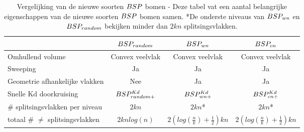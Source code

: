 \begin{table}[tb]
    \centering
    \begin{tabular}{@{}|l|c|c|c|@{}} \toprule      
            & $BSP_{random}$     & $BSP_{wn}$ & $BSP_{cn}$ \\ \midrule
      Omhullend volume & Convex veelvlak & Convex veelvlak & Convex veelvlak \\
      Sweeping                              &  Ja   & Ja & Ja    \\
      Geometrie afhankelijke vlakken & Nee & Ja & Ja \\
      Snelle Kd doorkruising                 & $BSP^{Kd}_{random+}$  & $BSP^{Kd}_{wn+}$  & $BSP^{Kd}_{cn+}$    \\
      \# splitsingsvlakken per niveau       &  $2kn$   & $2kn$* & $2kn$*  \\
      totaal \# $\neq$ splitsingsvlakken           &  $2knlog(n)$   & $2(log(\frac{n}{k}) + \frac{1}{2})kn$ & $2(log(\frac{n}{k}) + \frac{1}{2})kn$     \\ \bottomrule
    \end{tabular}
    \caption[Vergelijking van de nieuwe soorten $\symBSP$ bomen.]{Vergelijking van de nieuwe soorten $\symBSP$ bomen - \small Deze tabel vat een aantal belangrijke eigenschappen van de nieuwe soorten $\symBSP$ bomen samen. *De onderste niveaus van $BSP_{wn}$ en $BSP_{random}$ bekijken minder dan $2kn$ splitsingsvlakken.}
    \label{tab:boom-vergelijking-sweep}
  \end{table}

